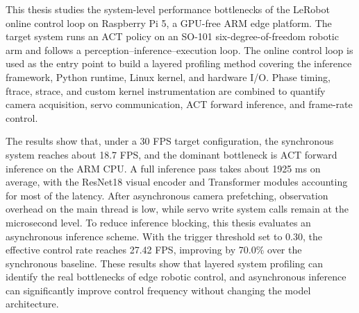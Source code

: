 
\begin{abstract}
本文面向树莓派5等无GPU ARM边缘平台上的LeRobot在线控制任务，研究 ACT 策略在 SO-101 六自由度机械臂中“观测--推理--执行”闭环的系统级性能瓶颈。随着端到端机器人学习框架逐渐进入低成本硬件平台，系统能否稳定达到目标控制频率，不仅取决于模型规模和硬件配置，也受到 Python 运行时、深度学习框架线程行为、Linux 内核调度以及设备 I/O 路径的共同影响。本文以在线控制主循环为切入点，构建覆盖推理框架、Python 运行时、Linux 内核和硬件 I/O 的分层分析方法。实验结合阶段计时、ftrace、strace 和内核插桩，对摄像头读取、舵机通信、ACT 前向推理和帧率控制等环节进行量化分析，并对测量工具自身扰动进行校准，以区分真实瓶颈与观测手段引入的额外开销。

实验结果表明，在 30 FPS 目标配置下，同步系统实测帧率约为 18.7 FPS，主要瓶颈来自 ARM CPU 上的 ACT 前向推理。工具校准实验显示，延迟导出的 ftrace 对主循环扰动较小，更适合后续定量分析；进一步的模块分解表明，单次完整推理平均耗时约 1925 ms，其中 ResNet18 视觉编码和 Transformer 模块占主要比例。相比之下，摄像头异步预取后主线程观测开销较低，舵机写入系统调用仅为微秒级，执行阶段主要受串口波特率和半双工总线约束。针对推理阻塞，本文验证了异步推理方案。当触发阈值取 0.30 时，系统有效控制频率达到 27.42 FPS，相比同步基线提升 70.0\%，并显著减少动作队列耗尽造成的停顿。结果说明，系统级分层剖析能够有效定位边缘机器人在线控制瓶颈，异步推理可在不改变模型结构的条件下显著提升控制频率，并为后续推理运行时优化、操作系统调度改进和机器人基础软件设计提供依据。
\end{abstract}

\begin{abstractEn}
This thesis studies the system-level performance bottlenecks of the LeRobot online control loop on Raspberry Pi 5, a GPU-free ARM edge platform. The target system runs an ACT policy on an SO-101 six-degree-of-freedom robotic arm and follows a perception--inference--execution loop. The online control loop is used as the entry point to build a layered profiling method covering the inference framework, Python runtime, Linux kernel, and hardware I/O. Phase timing, ftrace, strace, and custom kernel instrumentation are combined to quantify camera acquisition, servo communication, ACT forward inference, and frame-rate control.

The results show that, under a 30 FPS target configuration, the synchronous system reaches about 18.7 FPS, and the dominant bottleneck is ACT forward inference on the ARM CPU. A full inference pass takes about 1925 ms on average, with the ResNet18 visual encoder and Transformer modules accounting for most of the latency. After asynchronous camera prefetching, observation overhead on the main thread is low, while servo write system calls remain at the microsecond level. To reduce inference blocking, this thesis evaluates an asynchronous inference scheme. With the trigger threshold set to 0.30, the effective control rate reaches 27.42 FPS, improving by 70.0\% over the synchronous baseline. These results show that layered system profiling can identify the real bottlenecks of edge robotic control, and asynchronous inference can significantly improve control frequency without changing the model architecture.
\end{abstractEn}
